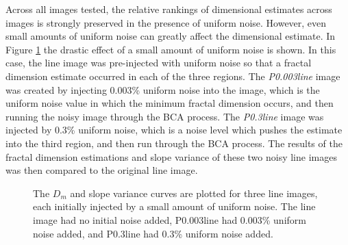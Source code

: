 \documentclass[12pt, oneside]{book}
\begin{document}
Across all images tested, the relative rankings of dimensional estimates across images is strongly preserved in the presence of uniform noise.  However, even small amounts of uniform noise can greatly affect the dimensional estimate.  In Figure \ref{fig:threelines} the drastic effect of a small amount of uniform noise is shown.  In this case, the line image was pre-injected with uniform noise so that a fractal dimension estimate occurred in each of the three regions.  The \textit{P0.003line} image was created by injecting 0.003\% uniform noise into the image, which is the uniform noise value in which the minimum fractal dimension occurs, and then running the noisy image through the BCA process.  The \textit{P0.3line} image was injected by 0.3\% uniform noise, which is a noise level which pushes the estimate into the third region, and then run through the BCA process.  The results of the fractal dimension estimations and slope variance of these two noisy line images was then compared to the original line image.

\begin{figure}[!b]
  \centering
  \caption[The \(D_{m}\) and slope variance curves are plotted for three line images, each initially injected by a small amount of uniform noise.]{The \(D_{m}\) and slope variance curves are plotted for three line images, each initially injected by a small amount of uniform noise.  The line image had no initial noise added, P0.003line had 0.003\% uniform noise added, and P0.3line had 0.3\% uniform noise added. }
  \label{fig:threelines}
\end{figure}
\end{document}

